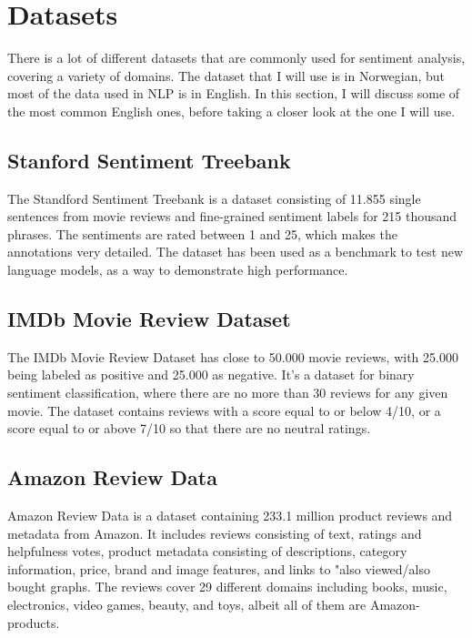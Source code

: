 \documentclass{report}
\begin{document}

\section{Datasets}
There is a lot of different datasets that are commonly used for sentiment analysis, covering a variety of domains. The dataset that I will use is in Norwegian, but most of the data used in NLP is in English. In this section, I will discuss some of the most common English ones, before taking a closer look at the one I will use.
\subsection{Stanford Sentiment Treebank}
The Standford Sentiment Treebank \cite{socher2013recursive} is a dataset consisting of 11.855 single sentences from movie reviews and fine-grained sentiment labels for 215 thousand phrases. The sentiments are rated between 1 and 25, which makes the annotations very detailed. The dataset has been used as a benchmark to test new language models, as a way to demonstrate high performance.
\subsection{IMDb Movie Review Dataset}
The IMDb Movie Review Dataset \cite{maas-EtAl:2011:ACL-HLT2011} has close to 50.000 movie reviews, with 25.000 being labeled as positive and 25.000 as negative. It's a dataset for binary sentiment classification, where there are no more than 30 reviews for any given movie. The dataset contains reviews with a score equal to or below 4/10, or a score equal to or above 7/10 so that there are no neutral ratings.
\subsection{Amazon Review Data}
Amazon Review Data \cite{ni2019justifying} is a dataset containing 233.1 million product reviews and metadata from Amazon. It includes reviews consisting of text, ratings and helpfulness votes, product metadata consisting of descriptions, category information, price, brand and image features, and links to "also viewed/also bought graphs. The reviews cover 29 different domains including books, music, electronics, video games, beauty, and toys, albeit all of them are Amazon-products.
\end{document}
